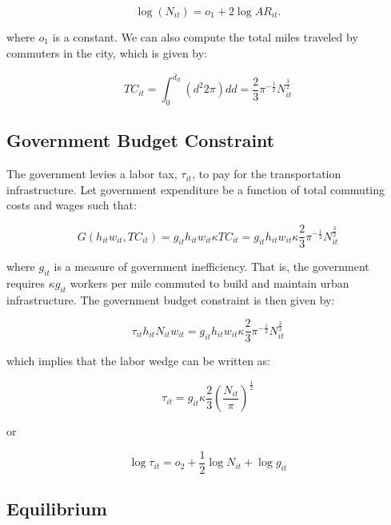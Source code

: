 \begin{equation}
    \log (N_{it}) = o_1 + 2 \log AR_{it}.
\end{equation}

where $o_1$ is a constant. We can also compute the total miles traveled by commuters in the city, which is given by:

\begin{equation}
    TC_{it} = \int_0^{\overline{d}_{it}} (d^2 2\pi) dd = \frac{2}{3} \pi^{-\frac{1}{2}} N_{it}^{\frac{3}{2}}
\end{equation}

\subsection{Government Budget Constraint}

The government levies a labor tax, $\tau_{it}$, to pay for the transportation infrastructure. Let government expenditure be a function of total commuting costs and wages such that:

\begin{equation*}
    G(h_{it} w_{it}, TC_{it}) = g_{it} h_{it} w_{it} \kappa TC_{it} = g_{it} h_{it} w_{it} \kappa \frac{2}{3} \pi^{-\frac{1}{2}} N_{it}^{\frac{3}{2}}
\end{equation*}

where $g_{it}$ is a measure of government inefficiency. That is, the government requires $\kappa g_{it}$ workers per mile commuted to build and maintain urban infrastructure. The government budget constraint is then given by:

\begin{equation}
    \tau_{it} h_{it} N_{it} w_{it} = g_{it} h_{it} w_{it} \kappa \frac{2}{3} \pi^{-\frac{1}{2}} N_{it}^{\frac{3}{2}}
\end{equation}

which implies that the labor wedge can be written as:

\begin{equation}
    \tau_{it} = g_{it} \kappa \frac{2}{3} (\frac{N_{it}}{\pi})^{\frac{1}{2}}
\end{equation}

or

\begin{equation}
    \log \tau_{it} = o_2 + \frac{1}{2} \log N_{it} + \log g_{it}
\end{equation}

\subsection{Equilibrium}

